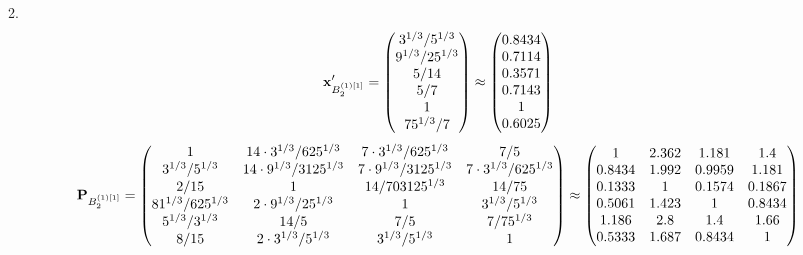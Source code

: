 \documentclass[10pt,a4paper]{article}
\begin{document}
	2.
	\[
		\bold{x}'_{B_2^{(1)[1]}} = 
		\begin{pmatrix}
			{{3^ {1 / 3}}} / {{5^ {1 / 3}}} \\
			{{9^ {1 / 3}}} / {{25^ {1 / 3}}} \\
			{{5}} / {{14}} \\
			{{5}} / {{7}} \\
			{1}{} \\
			{{75^ {1 / 3}}} / {{7}} \\
		\end{pmatrix}
		\approx
		\begin{pmatrix}
			0.8434   \\
			0.7114   \\
			0.3571   \\
			0.7143   \\
			1        \\
			0.6025   \\
		\end{pmatrix}
	\]
	\[
		\bold{P}_{B_2^{(1)[1]}} = 
		\begin{pmatrix}
			{1}{} & {{14} \cdot {3^ {1 / 3}}} / {{625^ {1 / 3}}} & {{7} \cdot {3^ {1 / 3}}} / {{625^ {1 / 3}}} & {{7}} / {{5}} \\
			{{3^ {1 / 3}}} / {{5^ {1 / 3}}} & {{14} \cdot {9^ {1 / 3}}} / {{3125^ {1 / 3}}} & {{7} \cdot {9^ {1 / 3}}} / {{3125^ {1 / 3}}} & {{7} \cdot {3^ {1 / 3}}} / {{625^ {1 / 3}}} \\
			{{2}} / {{15}} & {1}{} & {{14}} / {{703125^ {1 / 3}}} & {{14}} / {{75}} \\
			{{81^ {1 / 3}}} / {{625^ {1 / 3}}} & {{2} \cdot {9^ {1 / 3}}} / {{25^ {1 / 3}}} & {1}{} & {{3^ {1 / 3}}} / {{5^ {1 / 3}}} \\
			{{5^ {1 / 3}}} / {{3^ {1 / 3}}} & {{14}} / {{5}} & {{7}} / {{5}} & {{7}} / {{75^ {1 / 3}}} \\
			{{8}} / {{15}} & {{2} \cdot {3^ {1 / 3}}} / {{5^ {1 / 3}}} & {{3^ {1 / 3}}} / {{5^ {1 / 3}}} & {1}{} \\
		\end{pmatrix}
		\approx
		\begin{pmatrix}
			1        & 2.362    & 1.181    & 1.4      \\
			0.8434   & 1.992    & 0.9959   & 1.181    \\
			0.1333   & 1        & 0.1574   & 0.1867   \\
			0.5061   & 1.423    & 1        & 0.8434   \\
			1.186    & 2.8      & 1.4      & 1.66     \\
			0.5333   & 1.687    & 0.8434   & 1        \\
		\end{pmatrix}
	\]
\end{document}
